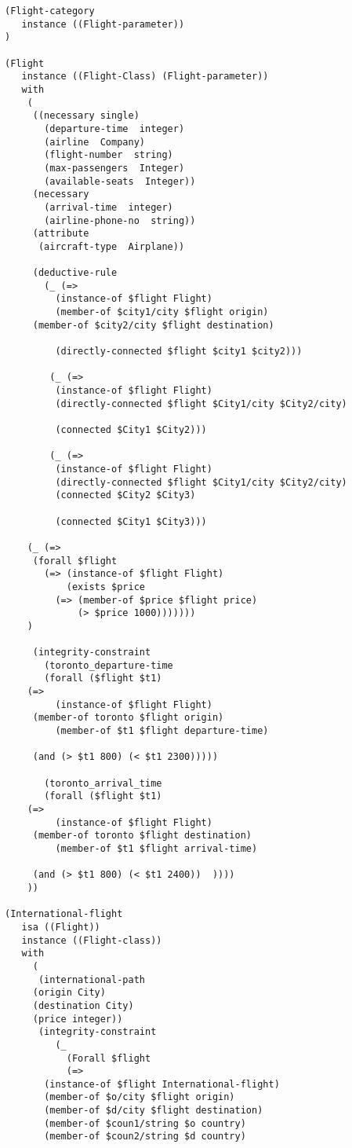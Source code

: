 \documentclass{article}
\begin{document}
{\begin{verbatim}
(Flight-category
   instance ((Flight-parameter))
)

(Flight
   instance ((Flight-Class) (Flight-parameter))
   with
    (
     ((necessary single)
       (departure-time  integer)
       (airline  Company)
       (flight-number  string)
       (max-passengers  Integer)
       (available-seats  Integer))
     (necessary
       (arrival-time  integer)
       (airline-phone-no  string))
     (attribute
      (aircraft-type  Airplane))

     (deductive-rule
       (_ (=>
         (instance-of $flight Flight)
         (member-of $city1/city $flight origin)
	 (member-of $city2/city $flight destination)

         (directly-connected $flight $city1 $city2)))

        (_ (=>
         (instance-of $flight Flight)
         (directly-connected $flight $City1/city $City2/city)

         (connected $City1 $City2)))

        (_ (=>
         (instance-of $flight Flight)
         (directly-connected $flight $City1/city $City2/city)
         (connected $City2 $City3)

         (connected $City1 $City3)))

	(_ (=>
	 (forall $flight
	   (=> (instance-of $flight Flight)
	       (exists $price
		 (=> (member-of $price $flight price)
		     (> $price 1000)))))))
	)

     (integrity-constraint
       (toronto_departure-time 
       (forall ($flight $t1)
	(=> 
         (instance-of $flight Flight)
	 (member-of toronto $flight origin)
         (member-of $t1 $flight departure-time)
          
	 (and (> $t1 800) (< $t1 2300)))))

       (toronto_arrival_time 
       (forall ($flight $t1)
	(=> 
         (instance-of $flight Flight)
	 (member-of toronto $flight destination)
         (member-of $t1 $flight arrival-time)
         
	 (and (> $t1 800) (< $t1 2400))  ))))
	))
  
(International-flight
   isa ((Flight))
   instance ((Flight-class))
   with
     (
      (international-path
	 (origin City)
	 (destination City)
	 (price integer))
      (integrity-constraint
         (_ 
           (Forall $flight
           (=>
	   (instance-of $flight International-flight)
	   (member-of $o/city $flight origin)
	   (member-of $d/city $flight destination)
	   (member-of $coun1/string $o country)
	   (member-of $coun2/string $d country)


\end{verbatim}}
\end{document}
